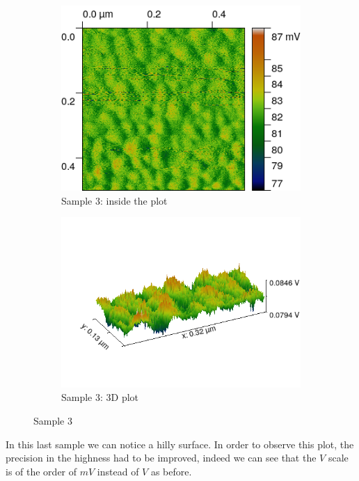 \documentclass[11pt,a4paper]{article}
\begin{document}
\begin{figure}[H]
\centering
\begin{subfigure}[b]{0.45\textwidth}
\includegraphics[width=\textwidth]{sm_sample3}
\caption{Sample 3: inside the plot}
\label{fig:}
\end{subfigure}
\begin{subfigure}[b]{0.45\textwidth}
\includegraphics[width=\textwidth]{sm_sample3_3D_improved}
\caption{Sample 3: 3D plot}
\label{fig:}
\end{subfigure}
\caption{Sample 3}
\end{figure}

In this last sample we can notice a hilly surface. In order to observe this plot, the precision in the highness had to be improved, indeed we can see that the $V$ scale is of the order of $mV$ instead of $V$ as before.
\end{document}
